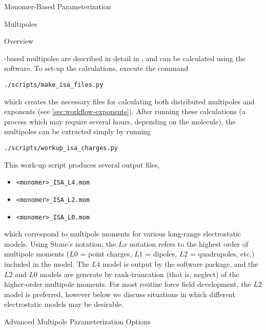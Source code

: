 \begin{section}{Monomer-Based Parameterization}
\begin{subsection}{Multipoles}
\begin{subsubsection}{Overview}

\isa-based multipoles are described in detail in , and can
be calculated using the \camcasp software. To set-up the \isa calculations,
execute the command
%
\begin{lstlisting}
./scripts/make_isa_files.py
\end{lstlisting}
%
which creates the necessary \isa files for calculating both distributed
multipoles and exponents (see \cref{sec:workflow-exponents}). After running
these calculations (a process which may require several hours, depending on
the molecule), the multipoles can be extracted simply by running
%
\begin{lstlisting}
./scripts/workup_isa_charges.py
\end{lstlisting}
%
This work-up script produces several output files,
\begin{itemize}
\item \verb|<monomer>_ISA_L4.mom|
\item \verb|<monomer>_ISA_L2.mom|
\item \verb|<monomer>_ISA_L0.mom|
\end{itemize}
which correspond to multipole moments for various long-range electrostatic
models. Using Stone's notation,\cite{stone2013theory} the $Lx$ notation refers
to the highest order of multipole moments ($L0$ = point charges, $L1$ =
dipoles, $L2$ = quadrupoles, etc.) included in the model. The $L4$ model is
output by the \camcasp software package, and the $L2$ and $L0$ models are
generate by rank-truncation (that is, neglect) of the higher-order multipole
moments. 
For most routine
force field development, the $L2$ model is preferred, however below we
discuss situations in which different electrostatic models may be desirable.

\end{subsubsection}
\begin{subsubsection}{Advanced Multipole Parameterization Options}


\end{subsubsection}
\end{subsection}
\end{section}
